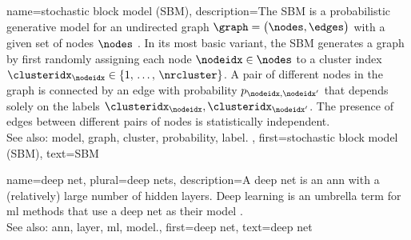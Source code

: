 {name={stochastic block model (SBM)},
	description={The SBM is a 
		probabilistic generative \gls{model} for an undirected \gls{graph} $\graph = \big( \nodes, \edges \big)$ 
		with a given set of nodes $\nodes$ \cite{AbbeSBM2018}. In its most basic variant, 
		the SBM generates a \gls{graph} by first randomly assigning each node $\nodeidx \in \nodes$ to 
		a \gls{cluster} index $\clusteridx_{\nodeidx} \in \{1, \,\ldots, \,\nrcluster\}$. A pair of different nodes in the 
		\gls{graph} is connected by an edge with \gls{probability} $p_{\nodeidx,\nodeidx'}$ that depends 
		solely on the \glspl{label} $\clusteridx_{\nodeidx}, \clusteridx_{\nodeidx'}$. 
		The presence of edges between different pairs of 
		nodes is statistically independent.
					\\ 
		See also: \gls{model}, \gls{graph}, \gls{cluster}, \gls{probability}, \gls{label}. },
	first={stochastic block model (SBM)},
	text={SBM} 
}

{name={deep net}, plural={deep nets},
	description={A deep net is an \gls{ann} with a (relatively) large number of 
		hidden \glspl{layer}. Deep learning is an umbrella term for \gls{ml} methods that use a deep 
		net as their \gls{model} \cite{Goodfellow-et-al-2016}.
				\\ 
		See also: \gls{ann}, \gls{layer}, \gls{ml}, \gls{model}.},
	first={deep net},
	text={deep net} 
}




